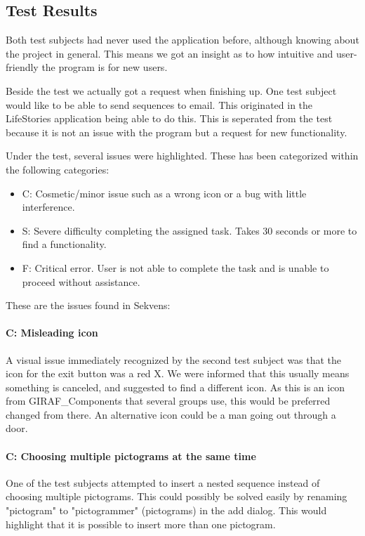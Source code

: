 \subsection{Test Results}\label{subsec:test_results}
Both test subjects had never used the application before, although knowing about the project in general. This means we got an insight as to how intuitive and user-friendly the program is for new users.

Beside the test we actually got a request when finishing up. One test subject would like to be able to send sequences to email. This originated in the LifeStories application being able to do this. This is seperated from the test because it is not an issue with the program but a request for new functionality.

Under the test, several issues were highlighted. These has been categorized within the following categories:

\begin{itemize}
\item C: Cosmetic/minor issue such as a wrong icon or a bug with little interference.
\item S: Severe difficulty completing the assigned task. Takes 30 seconds or more to find a functionality.
\item F: Critical error. User is not able to complete the task and is unable to proceed without assistance.
\end{itemize}

These are the issues found in Sekvens:
\paragraph{C: Misleading icon}
A visual issue immediately recognized by the second test subject was that the icon for the exit button was a red X. We were informed that this usually means something is canceled, and suggested to find a different icon. As this is an icon from GIRAF\_Components that several groups use, this would be preferred changed from there. An alternative icon could be a man going out through a door.

\paragraph{C: Choosing multiple pictograms at the same time}
One of the test subjects attempted to insert a nested sequence instead of choosing multiple pictograms. This could possibly be solved easily by renaming "pictogram" to "pictogrammer" (pictograms) in the add dialog. This would highlight that it is possible to insert more than one pictogram.

